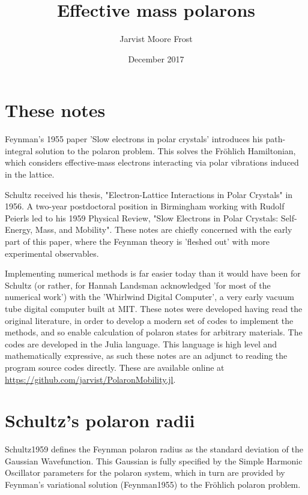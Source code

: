 \documentclass[twocolumn,11pt]{article}
\title{Effective mass polarons}
\author{Jarvist Moore Frost}
\date{December 2017}
\begin{document}
\maketitle

\section{These notes}

Feynman's 1955 paper 'Slow electrons in polar crystals'\cite{Feynman1955}
introduces his path-integral solution to the polaron problem. 
This solves the Fr\"ohlich Hamiltonian, which considers effective-mass
electrons interacting via polar vibrations induced in the lattice. 

Schultz\cite{Fowler2005} received his thesis, "Electron-Lattice Interactions in
Polar Crystals" in 1956. 
A two-year postdoctoral position in Birmingham working with Rudolf Peierls led
to his 1959 Physical Review, 
"Slow Electrons in Polar Crystals: Self-Energy, Mass, and
Mobility"\cite{Schultz1959}.  
These notes are chiefly concerned with the early part of this paper, where the
Feynman theory is 'fleshed out' with more experimental observables. 

Implementing numerical methods is far easier today than it would have been for
Schultz (or rather, for Hannah Landsman acknowledged 'for most of the numerical
work') with the 'Whirlwind Digital Computer'\cite{WhirlwindWikipedia}, a very early
vacuum tube digital computer built at MIT.  
These notes were developed having read the original literature, in order to
develop a modern set of codes to implement the methods, and so enable
calculation of polaron states for arbitrary materials. 
The codes are developed in the Julia language\cite{Julia}. 
This language is high level and mathematically expressive, as such these notes
are an adjunct to reading the program source codes directly.  
These are available online at
\url{https://github.com/jarvist/PolaronMobility.jl}.

\section{Schultz's polaron radii}

Schultz1959\cite{Schultz1959}  defines the
Feynman polaron radius as the standard deviation of the Gaussian Wavefunction. 
This Gaussian is fully specified by the Simple Harmonic Oscillator parameters
for the polaron system, which in turn are provided by Feynman's variational
solution (Feynman1955\cite{Feynman1955}) to the
Fr\"ohlich polaron problem.
\end{document}
